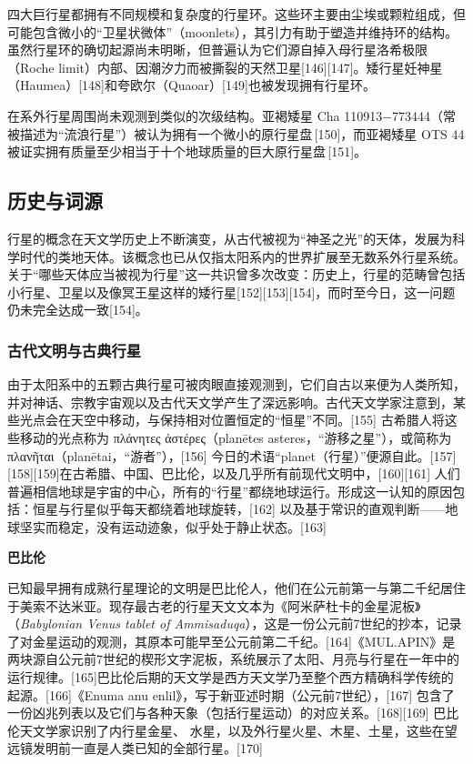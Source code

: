 四大巨行星都拥有不同规模和复杂度的行星环。这些环主要由尘埃或颗粒组成，但可能包含微小的“卫星状微体”（moonlets），其引力有助于塑造并维持环的结构。虽然行星环的确切起源尚未明晰，但普遍认为它们源自掉入母行星洛希极限（Roche limit）内部、因潮汐力而被撕裂的天然卫星[146][147]。矮行星妊神星（Haumea）[148]和夸欧尔（Quaoar）[149]也被发现拥有行星环。

在系外行星周围尚未观测到类似的次级结构。亚褐矮星 Cha 110913−773444（常被描述为“流浪行星”）被认为拥有一个微小的原行星盘\,[150]，而亚褐矮星 OTS 44 被证实拥有质量至少相当于十个地球质量的巨大原行星盘\,[151]。
\subsection{历史与词源}
行星的概念在天文学历史上不断演变，从古代被视为“神圣之光”的天体，发展为科学时代的类地天体。该概念也已从仅指太阳系内的世界扩展至无数系外行星系统。关于“哪些天体应当被视为行星”这一共识曾多次改变：历史上，行星的范畴曾包括小行星、卫星以及像冥王星这样的矮行星[152][153][154]，而时至今日，这一问题仍未完全达成一致[154]。
\subsubsection{古代文明与古典行星}
由于太阳系中的五颗古典行星可被肉眼直接观测到，它们自古以来便为人类所知，并对神话、宗教宇宙观以及古代天文学产生了深远影响。古代天文学家注意到，某些光点会在天空中移动，与保持相对位置恒定的“恒星”不同。[155] 古希腊人将这些移动的光点称为 πλάνητες ἀστέρες（planētes asteres，“游移之星”），或简称为 πλανῆται（planētai，“游者”），[156] 今日的术语“planet（行星）”便源自此。[157][158][159]在古希腊、中国、巴比伦，以及几乎所有前现代文明中，[160][161] 人们普遍相信地球是宇宙的中心，所有的“行星”都绕地球运行。形成这一认知的原因包括：恒星与行星似乎每天都绕着地球旋转，[162] 以及基于常识的直观判断——地球坚实而稳定，没有运动迹象，似乎处于静止状态。[163]

\textbf{巴比伦}

已知最早拥有成熟行星理论的文明是巴比伦人，他们在公元前第一与第二千纪居住于美索不达米亚。现存最古老的行星天文文本为《阿米萨杜卡的金星泥板》（\emph{Babylonian Venus tablet of Ammisaduqa}），这是一份公元前7世纪的抄本，记录了对金星运动的观测，其原本可能早至公元前第二千纪。[164]《MUL.APIN》是两块源自公元前7世纪的楔形文字泥板，系统展示了太阳、月亮与行星在一年中的运行规律。[165]巴比伦后期的天文学是西方天文学乃至整个西方精确科学传统的起源。[166]《Enuma anu enlil》，写于新亚述时期（公元前7世纪），[167] 包含了一份凶兆列表以及它们与各种天象（包括行星运动）的对应关系。[168][169] 巴比伦天文学家识别了内行星金星、 水星，以及外行星火星、木星、土星，这些在望远镜发明前一直是人类已知的全部行星。[170]

